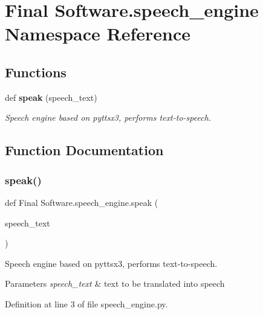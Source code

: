 \section{Final Software.\+speech\+\_\+engine Namespace Reference}
\label{namespace_final_01_software_1_1speech__engine}
\subsection*{Functions}
\begin{DoxyCompactItemize}
\item 
def \textbf{ speak} (speech\+\_\+text)
\begin{DoxyCompactList}\small\item\em Speech engine based on pyttsx3, performs text-\/to-\/speech. \end{DoxyCompactList}\end{DoxyCompactItemize}


\subsection{Function Documentation}
\mbox{\label{namespace_final_01_software_1_1speech__engine_a8205fb6e25d0f882f071e6a0bb63bd3a}} 
\subsubsection{speak()}
{\footnotesize\ttfamily def Final Software.\+speech\+\_\+engine.\+speak (\begin{DoxyParamCaption}\item[{}]{speech\+\_\+text }\end{DoxyParamCaption})}



Speech engine based on pyttsx3, performs text-\/to-\/speech. 


\begin{DoxyParams}{Parameters}
{\em speech\+\_\+text} & text to be translated into speech \\
\hline
\end{DoxyParams}


Definition at line 3 of file speech\+\_\+engine.\+py.

